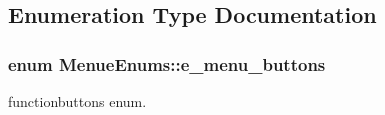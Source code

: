 \subsection{Enumeration Type Documentation}
\hypertarget{namespaceMenueEnums_af6a67aad066c2f00c824935e696c8a3a}{
\subsubsection[{e\-\_\-menu\-\_\-buttons}]{\setlength{\rightskip}{0pt plus 5cm}enum {\bf Menue\-Enums\-::e\-\_\-menu\-\_\-buttons}}}\label{namespaceMenueEnums_af6a67aad066c2f00c824935e696c8a3a}


functionbuttons enum. 

